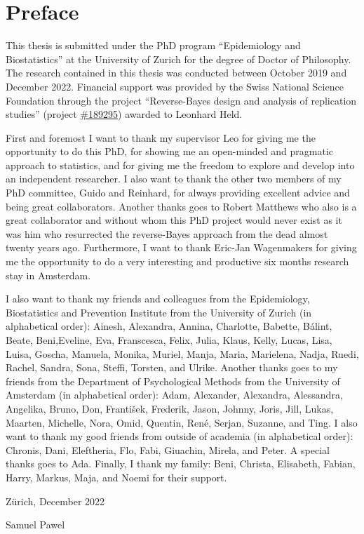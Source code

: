 \section*{Preface}

This thesis is submitted under the PhD program ``Epidemiology and
Biostatistics'' at the University of Zurich for the degree of Doctor of
Philosophy.
The research contained in this thesis was conducted between October 2019 and
December 2022. Financial support was provided by the Swiss National Science
Foundation through the project ``Reverse-Bayes design and analysis of
replication studies'' (project
\href{https://data.snf.ch/grants/grant/189295}{\#189295}) awarded to Leonhard
Held.

First and foremost I want to thank my supervisor Leo for giving me the
opportunity to do this PhD, for showing me an open-minded and pragmatic approach
to statistics, and for giving me the freedom to explore and develop into an
independent researcher. I also want to thank the other two members of my PhD
committee, Guido and Reinhard, for always providing excellent advice and being
great collaborators. Another thanks goes to Robert Matthews who also is a great
collaborator and without whom this PhD project would never exist as it was him
who resurrected the reverse-Bayes approach from the dead almost twenty years
ago. Furthermore, I want to thank Eric-Jan Wagenmakers for giving me the
opportunity to do a very interesting and productive six months research stay in
Amsterdam.

I also want to thank my friends and colleagues from the Epidemiology,
Biostatistics and Prevention Institute from the University of Zurich (in
alphabetical order): Ainesh, Alexandra, Annina, Charlotte, Babette, Bálint,
Beate, Beni,Eveline, Eva, Franscesca, Felix, Julia, Klaus, Kelly, Lucas, Lisa,
Luisa, Goscha, Manuela, Monika, Muriel, Manja, Maria, Marielena, Nadja, Ruedi,
Rachel, Sandra, Sona, Steffi, Torsten, and Ulrike. Another thanks goes to my
friends from the Department of Psychological Methods from the University of
Amsterdam (in alphabetical order): Adam, Alexander, Alexandra, Alessandra,
Angelika, Bruno, Don, František, Frederik, Jason, Johnny, Joris, Jill, Lukas,
Maarten, Michelle, Nora, Omid, Quentin, René, Serjan, Suzanne, and Ting. I also
want to thank my good friends from outside of academia (in alphabetical order):
Chronis, Dani, Eleftheria, Flo, Fabi, Giuachin, Mirela, and Peter. A special
thanks goes to Ada. Finally, I thank my family: Beni, Christa, Elisabeth,
Fabian, Harry, Markus, Maja, and Noemi for their support.

\begin{flushright}
  \hfill Zürich, December 2022

  \hfill Samuel Pawel
\end{flushright}

